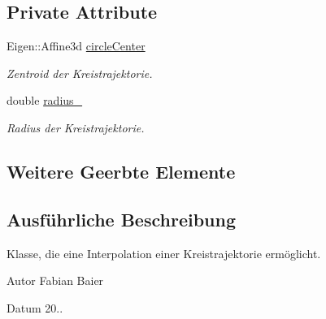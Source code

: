 \subsection*{Private Attribute}
\begin{DoxyCompactItemize}
\item 
\hypertarget{classCircleTrajectory_a4e09c5712c0944044fcba484c8ebbfeb}{Eigen\-::\-Affine3d \hyperlink{classCircleTrajectory_a4e09c5712c0944044fcba484c8ebbfeb}{circle\-Center}}\label{classCircleTrajectory_a4e09c5712c0944044fcba484c8ebbfeb}

\begin{DoxyCompactList}\small\item\em Zentroid der Kreistrajektorie. \end{DoxyCompactList}\item 
\hypertarget{classCircleTrajectory_adcf4904d1d0fbb68773745aa7cd32621}{double \hyperlink{classCircleTrajectory_adcf4904d1d0fbb68773745aa7cd32621}{radius\-\_\-}}\label{classCircleTrajectory_adcf4904d1d0fbb68773745aa7cd32621}

\begin{DoxyCompactList}\small\item\em Radius der Kreistrajektorie. \end{DoxyCompactList}\end{DoxyCompactItemize}
\subsection*{Weitere Geerbte Elemente}


\subsection{Ausführliche Beschreibung}
Klasse, die eine Interpolation einer Kreistrajektorie ermöglicht. 

\begin{DoxyAuthor}{Autor}
Fabian Baier 
\end{DoxyAuthor}
\begin{DoxyDate}{Datum}
20.. 
\end{DoxyDate}


